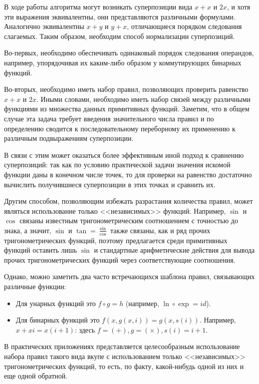 \documentclass[12pt,a4paper]{amsart}
\begin{document}
В ходе работы алгоритма могут возникать суперпозиции вида $x + x$ и $2x$,
и хотя эти выражения эквивалентны, они представляются различными формулами.
Аналогично эквивалентны $x + y$ и $y + x$, отличающиеся порядком следования
слагаемых. Таким образом, необходим способ нормализации суперпозиций.

Во-первых, необходимо обеспечивать одинаковый порядок следования операндов,
например, упорядочивая их каким-либо образом у коммутирующих бинарных функций.

Во-вторых, необходимо иметь набор правил, позволяющих проверить равенство
$x + x$ и $2x$. Иными словами, необходимо иметь набор связей между различными
функциями из множества данных примитивных функций. Заметим, что в общем
случае эта задача требует введения значительного числа правил и по определению
сводится к последовательному переборному их применению к различным
подвыражениям суперпозиции.

В связи с этим может оказаться более эффективным иной подход к сравнению
суперпозиций: так как по условию практической задачи значения искомой функции
даны в конечном числе точек, то для проверки на равенство достаточно вычислить
получившиеся суперпозиции в этих точках и сравнить их.

Другим способом, позволяющим избежать разрастания количества правил, может
являться использование только <<независимых>> функций. Например, $\sin$ и
$\cos$ связаны известным тригонометрическим соотношением с точностью до знака,
а значит, $\sin$ и $\tan = \frac{\sin}{\cos}$ также связаны, как и ряд прочих
тригонометрических функций, поэтому предлагается среди примитивных функций
оставить лишь $\sin$ и стандартные арифметические действия для вывода прочих
тригонометрических функций через соответствующие соотношения.

Однако, можно заметить два часто встречающихся шаблона правил, связывающих
различные функции:
\begin{itemize}
  \item Для унарных функций это $f \circ g = h$ (например,
	$\ln \circ \exp = id$).
  \item Для бинарных функций это $ f (x, g (x, i)) = g (x, s (i)) $.
	Например, $x + xi = x(i+1)$: здесь $f = (+), g = (\times), s(i) = i + 1$.
\end{itemize}

В практических приложениях представляется целесообразным использование
набора правил такого вида вкупе с использованием только <<независимых>>
тригонометрических функций, то есть, по факту, какой-нибудь одной из них
и еще одной обратной.
\end{document}
